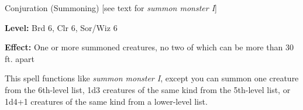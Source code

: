 
Conjuration (Summoning) [see text for \textit{summon monster I}]

\textbf{Level:} Brd 6, Clr 6, Sor/Wiz 6

\textbf{Effect:} One or more summoned creatures, no two of which can be more than 
30 ft. apart

This spell functions like \textit{summon monster I}, except you can summon one 
creature from the 6th-level list, 1d3 creatures of the same kind from the 5th-level 
list, or 1d4+1 creatures of the same kind from a lower-level list.

